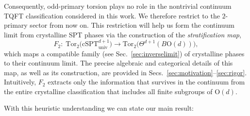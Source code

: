 \documentclass[aps,prx,reprint,superscriptaddress,twocolumn,amsmath,amssymb,amsfonts, nofootinbib]{revtex4-2}
\newcommand{\tor}{\text{Tor}}
\theoremstyle{apsstyle}
\begin{document}
Consequently, odd-primary torsion plays no role in the nontrivial continuum TQFT classification considered in this work. We therefore restrict to the $2$-primary sector from now on. This restriction will help us form the continuum limit from crystalline SPT phases via the construction of the \emph{stratification map},
\begin{equation*}
    F_{2}:\;\tor_{2}\bigl(\mathrm{cSPT}^{d+1}_{\mathrm{univ}}\bigr) \longrightarrow \tor_{2}\bigl(\Theta^{d+1}(B\mathrm{O}(d))\bigr),
\end{equation*}
which maps a compatible family (see Sec.~\ref{sec:inverselimit})
of crystalline phases to their continuum limit. The precise algebraic and categorical details of this map, as well as its construction, are provided in Secs.~\ref{sec:motivation}–\ref{sec:rigor}. Intuitively, $F_{2}$ extracts only the information that survives in the continuum from the entire crystalline classification that includes all finite subgroups of $\mathrm{O}(d)$. 


With this heuristic understanding we can state our main result:

\medskip
\end{document}
